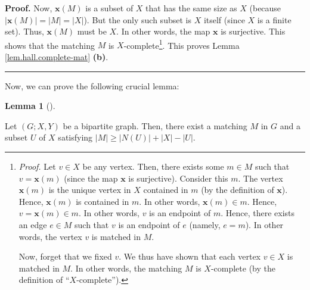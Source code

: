 \documentclass[numbers=enddot,12pt,final,onecolumn,notitlepage]{scrartcl}%
\theoremstyle{definition}
\newtheorem{lem}[theo]{Lemma}
\newenvironment{lemma}[1][]
{\begin{lem}[#1]\begin{leftbar}}
{\end{leftbar}\end{lem}}
\newenvironment{proof}[1][Proof]{\noindent\textbf{#1.} }{\ \rule{0.5em}{0.5em}}
\begin{document}
\begin{proof}
Now, $\mathbf{x}\left(  M\right)  $ is a subset of $X$ that has the same size
as $X$ (because $\left\vert \mathbf{x}\left(  M\right)  \right\vert
=\left\vert M\right\vert =\left\vert X\right\vert $). But the only such subset
is $X$ itself (since $X$ is a finite set). Thus, $\mathbf{x}\left(  M\right)
$ must be $X$. In other words, the map $\mathbf{x}$ is surjective. This shows
that the matching $M$ is $X$-complete\footnote{\textit{Proof.} Let $v\in X$ be
any vertex. Then, there exists some $m\in M$ such that $v=\mathbf{x}\left(
m\right)  $ (since the map $\mathbf{x}$ is surjective). Consider this $m$. The
vertex $\mathbf{x}\left(  m\right)  $ is the unique vertex in $X$ contained in
$m$ (by the definition of $\mathbf{x}$). Hence, $\mathbf{x}\left(  m\right)  $
is contained in $m$. In other words, $\mathbf{x}\left(  m\right)  \in m$.
Hence, $v=\mathbf{x}\left(  m\right)  \in m$. In other words, $v$ is an
endpoint of $m$. Hence, there exists an edge $e\in M$ such that $v$ is an
endpoint of $e$ (namely, $e=m$). In other words, the vertex $v$ is matched in
$M$.
\par
Now, forget that we fixed $v$. We thus have shown that each vertex $v\in X$ is
matched in $M$. In other words, the matching $M$ is $X$-complete (by the
definition of \textquotedblleft$X$-complete\textquotedblright).}. This proves
Lemma \ref{lem.hall.complete-mat} \textbf{(b)}.
\end{proof}

Now, we can prove the following crucial lemma:

\begin{lemma}
\label{lem.hall.MU}Let $\left(  G;X,Y\right)  $ be a bipartite graph. Then,
there exist a matching $M$ in $G$ and a subset $U$ of $X$ satisfying
$\left\vert M\right\vert \geq\left\vert N\left(  U\right)  \right\vert
+\left\vert X\right\vert -\left\vert U\right\vert $.
\end{lemma}
\end{document}
